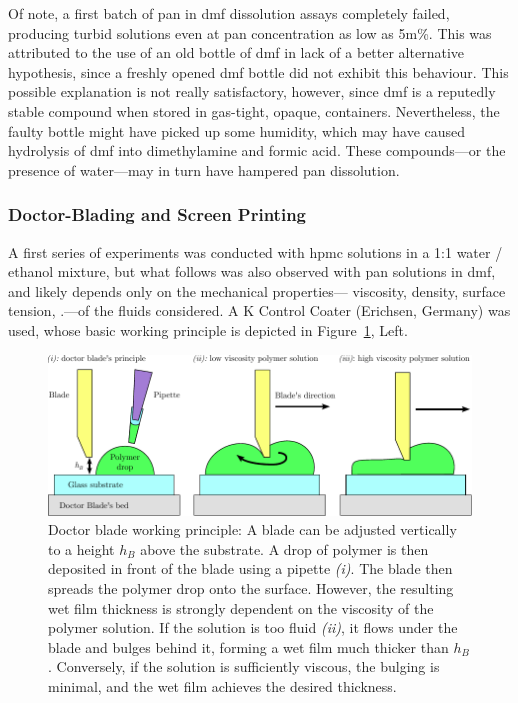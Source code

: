 Of note, a first batch of \gls{pan} in \gls{dmf} dissolution assays completely failed, producing turbid solutions even at \gls{pan} concentration as low as 5m\%. This was attributed to the use of an old bottle of \gls{dmf} in lack of a better alternative hypothesis, since a freshly opened \gls{dmf} bottle did not exhibit this behaviour. This possible explanation is not really satisfactory, however, since \gls{dmf} is a reputedly stable compound when stored in gas-tight, opaque, containers. Nevertheless, the faulty bottle might have picked up some humidity, which may have caused hydrolysis of \gls{dmf} into dimethylamine and formic acid\cite{juillard1977}. These compounds---or the presence of water---may in turn have hampered \gls{pan} dissolution.

\subsubsection{Doctor-Blading and Screen Printing}\label{subsect:thin_film:experimental:doctor_screen}

A first series of experiments was conducted with \gls{hpmc} solutions in a 1:1 water / ethanol mixture, but what follows was also observed with \gls{pan} solutions in \gls{dmf}, and likely depends only on the mechanical properties---\ie{} viscosity, density, surface tension, \etc.---of the fluids considered. A K Control Coater (Erichsen, Germany) was used, whose basic working principle is depicted in Figure~\ref{fig:thin_film:experimental:doctor_blade}, Left. 

\begin{figure}
	\centering
	\includegraphics{1_main_matter/thin_film_figures/experimentals/doctor_blade.pdf}
	\caption[Doctor blade schematic and the bulging issue.]{Doctor blade working principle: A blade can be adjusted vertically to a height $h_B$ above the substrate. A drop of polymer is then deposited in front of the blade using a pipette \textit{(i)}. The blade then spreads the polymer drop onto the surface. However, the resulting wet film thickness is strongly dependent on the viscosity of the polymer solution. If the solution is too fluid \textit{(ii)}, it flows under the blade and bulges behind it, forming a wet film much thicker than $h_B$. Conversely, if the solution is sufficiently viscous, the bulging is minimal, and the wet film achieves the desired thickness.}
	\label{fig:thin_film:experimental:doctor_blade}
\end{figure}

